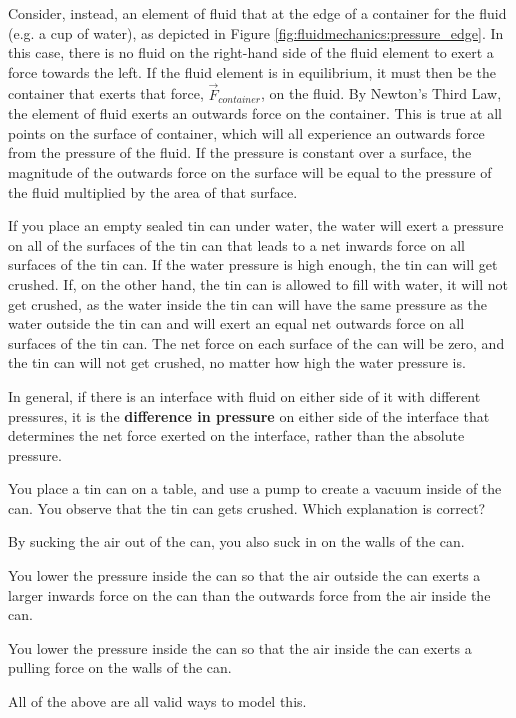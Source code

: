 Consider, instead, an element of fluid that at the edge of a container for the fluid (e.g. a cup of water), as depicted in Figure \ref{fig:fluidmechanics:pressure_edge}.
In this case, there is no fluid on the right-hand side of the fluid element to exert a force towards the left. If the fluid element is in equilibrium, it must then be the container that exerts that force, $\vec F_{container}$, on the fluid. By Newton's Third Law, the element of fluid exerts an outwards force on the container. This is true at all points on the surface of container, which will all experience an outwards force from the pressure of the fluid. If the pressure is constant over a surface, the magnitude of the outwards force on the surface will be equal to the pressure of the fluid multiplied by the area of that surface. 

If you place an empty sealed tin can under water, the water will exert a pressure on all of the surfaces of the tin can that leads to a net inwards force on all surfaces of the tin can. If the water pressure is high enough, the tin can will get crushed. If, on the other hand, the tin can is allowed to fill with water, it will not get crushed, as the water inside the tin can will have the same pressure as the water outside the tin can and will exert an equal net outwards force on all surfaces of the tin can. The net force on each surface of the can will be zero, and the tin can will not get crushed, no matter how high the water pressure is. 

In general, if there is an interface with fluid on either side of it with different pressures, it is the \textbf{difference in pressure} on either side of the interface that determines the net force exerted on the interface, rather than the absolute pressure.

\begin{checkpoint}
\begin{MCquestion}{You place a tin can on a table, and use a pump to create a vacuum inside of the can. You observe that the tin can gets crushed. Which explanation is correct?}
\item By sucking the air out of the can, you also suck in on the walls of the can. 
\item You lower the pressure inside the can so that the air outside the can exerts a larger inwards force on the can than the outwards force from the air inside the can. \correct
\item You lower the pressure inside the can so that the air inside the can exerts a pulling force on the walls of the can.
\item All of the above are all valid ways to model this. 
\end{MCquestion}
\end{checkpoint}

